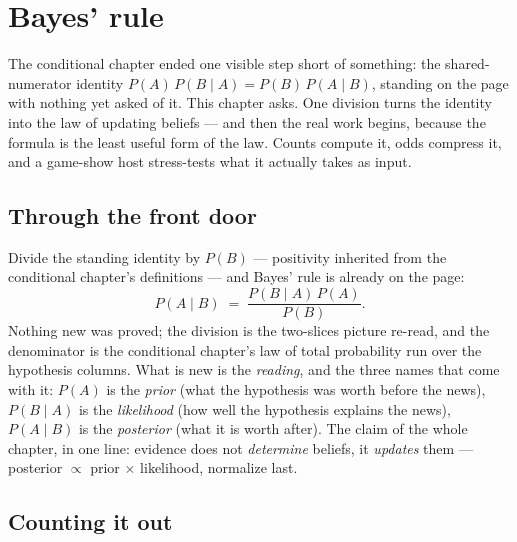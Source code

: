 \chapter{Bayes' rule}

\begin{narrative}
The conditional chapter ended one visible step short of something: the
shared-numerator identity $P(A)\,P(B \mid A) = P(B)\,P(A \mid B)$,
standing on the page with nothing yet asked of it. This chapter asks.
One division turns the identity into the law of updating beliefs — and
then the real work begins, because the formula is the least useful form
of the law. Counts compute it, odds compress it, and a game-show host
stress-tests what it actually takes as input.

\section{Through the front door}

Divide the standing identity by $P(B)$ — positivity inherited from the
conditional chapter's definitions — and Bayes' rule is already on the
page:
\[
  P(A \mid B) \;=\; \frac{P(B \mid A)\,P(A)}{P(B)} .
\]
Nothing new was proved; the division is the two-slices picture re-read,
and the denominator is the conditional chapter's law of total
probability run over the hypothesis columns. What is new is the
\emph{reading}, and the three names that come with it: $P(A)$ is the
\emph{prior} (what the hypothesis was worth before the news),
$P(B \mid A)$ is the \emph{likelihood} (how well the hypothesis
explains the news), $P(A \mid B)$ is the \emph{posterior} (what it is
worth after). The claim of the whole chapter, in one line: evidence
does not \emph{determine} beliefs, it \emph{updates} them —
posterior $\propto$ prior $\times$ likelihood, normalize last.

\section{Counting it out}


\end{narrative}
